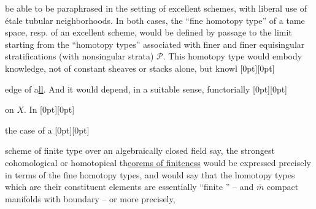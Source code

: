 %
be able to be paraphrased in the setting of excellent schemes, with liberal use of étale tubular neighborhoods.
In both cases, the ``fine homotopy type'' of a tame space, resp. of an excellent scheme, would be defined by passage to the limit starting from the
``homotopy types'' associated with finer and finer equisingular stratifications (with nonsingular strata) $\mathcal{P}$.
This  homotopy type would embody knowledge, not of  constant sheaves or stacks alone, but
 knowl%
\raisebox{0pt}[0pt][0pt]{\parbox{0pt}{}}%
edge of
a\uline{ll}. And it would depend, in a suitable sense,
functorially%
\raisebox{0pt}[0pt][0pt]{\parbox{0pt}{}}
on $X$. In%
\raisebox{0pt}[0pt][0pt]{\parbox{0pt}{}}
the case of a%
\raisebox{0pt}[0pt][0pt]{\parbox{0pt}{}}
scheme of finite type over an algebraically closed field say, the strongest cohomological or homotopical
th\uline{eorems of finiteness} would be expressed precisely in terms of the fine homotopy types, and would say that the  homotopy types which are their constituent elements are essentially ``finite '' -- and $\overline{m}$ compact manifolds with boundary -- or more precisely,
